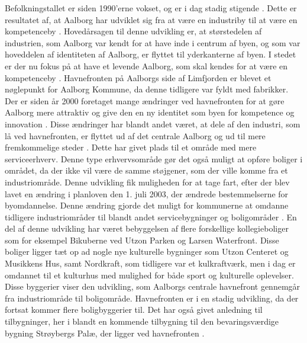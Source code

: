 \newline \indent{     }  Befolkningstallet er siden 1990'erne vokset, og er i dag stadig stigende \citep{indbyggertal}. Dette er resultatet af, at Aalborg har udviklet sig fra at være en industriby til at være en kompetenceby \citep{kommuneplan3}. Hovedårsagen til denne udvikling er, at størstedelen af industrien, som Aalborg var kendt for at have inde i centrum af byen, og som var hoveddelen af identiteten af Aalborg, er flyttet til yderkanterne af byen. I stedet er der nu fokus på at have et levende Aalborg, som skal kendes for at være en kompetenceby \citep{kommuneplan3}.
\newline \indent{     }  Havnefronten på Aalborgs side af Limfjorden er blevet et nøglepunkt for Aalborg Kommune, da denne tidligere var fyldt med fabrikker. Der er siden år 2000 foretaget mange ændringer ved havnefronten for at gøre Aalborg mere attraktiv og give den en ny identitet som byen for kompetence og innovation \citep{brughavnen}.
\newline \indent{     }  Disse ændringer har blandt andet været, at dele af den industri, som lå ved havnefronten, er flyttet ud af det centrale Aalborg og ud til mere fremkommelige steder \citep{kommuneplan3}. Dette har givet plads til et område med mere serviceerhverv. Denne type erhvervsområde gør det også muligt at opføre boliger i området, da der ikke vil være de samme støjgener, som der ville komme fra et industriområde. Denne udvikling fik muligheden for at tage fart, efter der blev lavet en ændring i planloven den 1. juli 2003, der ændrede bestemmelserne for byomdannelse. Denne ændring gjorde det muligt for kommunerne at omdanne tidligere industriområder til blandt andet servicebygninger og boligområder \citep{sort}.
En del af denne udvikling har været bebyggelsen af flere forskellige kollegieboliger som for eksempel Bikuberne ved Utzon Parken og Larsen Waterfront. Disse boliger ligger tæt op ad nogle nye kulturelle bygninger som Utzon Centeret og Musikkens Hus, samt Nordkraft, som tidligere var et kulkraftværk, men i dag er omdannet til et kulturhus med mulighed for både sport og kulturelle oplevelser. Disse byggerier viser den udvikling, som Aalborgs centrale havnefront gennemgår fra industriområde til boligområde. Havnefronten er i en stadig udvikling, da der fortsat kommer flere boligbyggerier til. Det har også givet anledning til tilbygninger, her i blandt en kommende tilbygning til den bevaringsværdige bygning Strøybergs Palæ, der ligger ved havnefronten \citep{havnefronterne}.

